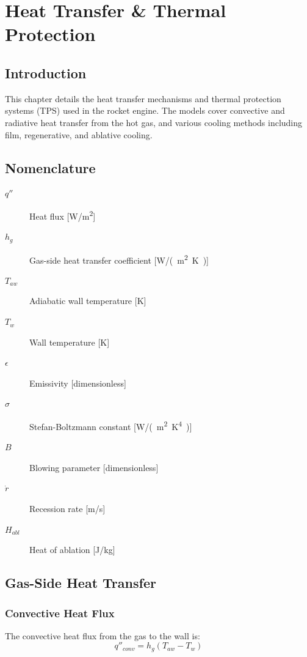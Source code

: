 \section{Heat Transfer \& Thermal Protection}

\subsection{Introduction}
This chapter details the heat transfer mechanisms and thermal protection systems (TPS) used in the rocket engine. The models cover convective and radiative heat transfer from the hot gas, and various cooling methods including film, regenerative, and ablative cooling.

\subsection{Nomenclature}
\begin{description}
    \item[\(q''\)] Heat flux [\si{W/m^2}]
    \item[\(h_g\)] Gas-side heat transfer coefficient [\si{W/(m^2.K)}]
    \item[\(T_{aw}\)] Adiabatic wall temperature [\si{K}]
    \item[\(T_w\)] Wall temperature [\si{K}]
    \item[\(\epsilon\)] Emissivity [dimensionless]
    \item[\(\sigma\)] Stefan-Boltzmann constant [\si{W/(m^2.K^4)}]
    \item[\(B\)] Blowing parameter [dimensionless]
    \item[\(\dot{r}\)] Recession rate [\si{m/s}]
    \item[\(H_{abl}\)] Heat of ablation [\si{J/kg}]
\end{description}

\subsection{Gas-Side Heat Transfer}

\subsubsection{Convective Heat Flux}
The convective heat flux from the gas to the wall is:
\begin{equation}
q''_{conv} = h_g (T_{aw} - T_w)
\end{equation}

